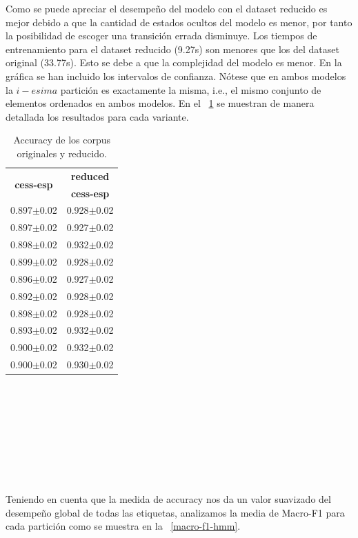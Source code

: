 \documentclass[11pt,a4paper]{report}
\begin{document}
	Como se puede apreciar el desempeño del modelo con el dataset reducido es mejor debido a que la cantidad de estados ocultos del modelo es menor, por tanto la posibilidad de escoger una transición errada disminuye. Los tiempos de entrenamiento para el dataset reducido (9.27s) son menores que los del dataset original (33.77s). Esto se debe a que la complejidad del modelo es menor. En la gráfica se han incluido los intervalos de confianza. Nótese  que en ambos modelos la $i-esima$ partición es exactamente la misma, i.e., el mismo conjunto de elementos ordenados en ambos modelos. En el \tablename~\ref{HMM_task1_table} se muestran de manera detallada los resultados para cada variante.
	\begin{table}[thb!]
		\begin{center} 		
			\begin{tabular}{cc} 
				\hline	
				\multirow{2}{*}{\textbf{cess-esp}}&\textbf{reduced}\\
				&\textbf{cess-esp}\\
				\hline
				0.897$\pm$0.02&0.928$\pm$0.02\\
				0.897$\pm$0.02&0.927$\pm$0.02\\
				0.898$\pm$0.02&0.932$\pm$0.02\\
				0.899$\pm$0.02&0.928$\pm$0.02\\
				0.896$\pm$0.02&0.927$\pm$0.02\\
				0.892$\pm$0.02&0.928$\pm$0.02\\
				0.898$\pm$0.02&0.928$\pm$0.02\\
				0.893$\pm$0.02&0.932$\pm$0.02\\
				0.900$\pm$0.02&0.932$\pm$0.02\\
				0.900$\pm$0.02&0.930$\pm$0.02\\
				\hline
			\end{tabular}
			\caption{Accuracy de los corpus originales y reducido.}	
			\label{HMM_task1_table}
		\end{center}
	\end{table}		 	
	\\\\\\\\\\\\\\\\

	
	Teniendo en cuenta que la medida de accuracy nos da un valor suavizado del desempeño global de todas las etiquetas, analizamos la media de Macro-F1 para cada partición como se muestra en la \figurename~\ref{macro-f1-hmm}.
	
\end{document}
